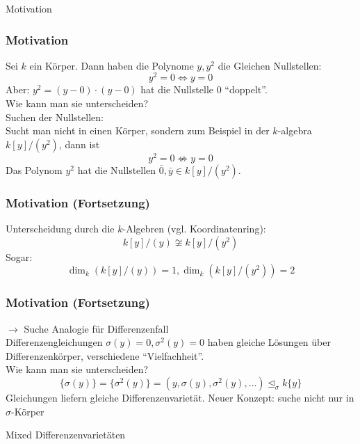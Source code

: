 \documentclass{beamer}
\def\s{\sigma}
\def\si{\unlhd_{\sigma}}
\theoremstyle{definition}
\begin{document}
\begin{frame}
\begin{center}
\LARGE Motivation
\end{center}
\end{frame}

\begin{frame}\frametitle{Motivation}
Sei $k$ ein Körper. Dann haben die Polynome $y, y^2$ die Gleichen Nullstellen: 
\[ y^2 = 0 \Leftrightarrow y = 0 \]
Aber: $y^2 = (y - 0) \cdot (y - 0)$ hat die Nullstelle $0$ ``doppelt''. \\
Wie kann man sie unterscheiden?\\
\vspace{10pt}
Suchen der Nullstellen: \\
Sucht man nicht in einen Körper, sondern zum Beispiel in der $k$-algebra $k[y]/(y^2)$,
dann ist 
\[ y^2 = 0 \not \Leftrightarrow y = 0 \]
Das Polynom $y^2$ hat die Nullstellen $\bar 0, \bar y \in k[y]/(y^2)$.
\end{frame}

\begin{frame}\frametitle{Motivation (Fortsetzung)}

Unterscheidung durch die $k$-Algebren (vgl. Koordinatenring):
$$k[y]/(y) \not \cong k[y]/(y^2)$$
Sogar:
$$\dim_k(k[y]/(y)) = 1, \dim_k(k[y]/(y^2)) = 2$$
\end{frame}

\begin{frame}\frametitle{Motivation (Fortsetzung)}
$\rightarrow$ Suche Analogie für Differenzenfall \\
$\phantom{ }$ \\
Differenzengleichungen $\s(y) = 0, \s^2(y) = 0$ haben gleiche Lösungen über Differenzenkörper,
verschiedene ``Vielfachheit''.\\
Wie kann man sie unterscheiden?
\[ \{ \s(y) \} = \{ \s^2(y) \} = (y,\s(y),\s^2(y),\ldots) \si k\{y\} \]
Gleichungen liefern gleiche Differenzenvarietät. Neuer Konzept: suche nicht nur in $\s$-Körper
\end{frame}

\begin{frame}
\begin{center}
\LARGE Mixed Differenzenvarietäten
\end{center}
\end{frame}
\end{document}
